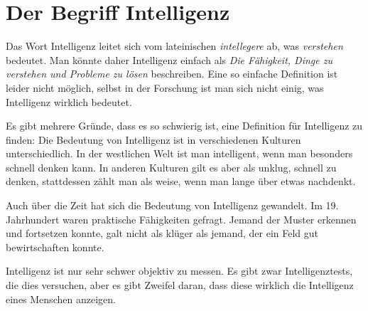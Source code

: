 \chapter{Der Begriff Intelligenz}

Das Wort Intelligenz leitet sich vom lateinischen \emph{intellegere} ab, was \emph{verstehen} bedeutet. Man könnte daher Intelligenz einfach als \emph{Die Fähigkeit, Dinge zu verstehen und Probleme zu lösen} beschreiben.
Eine so einfache Definition ist leider nicht möglich, selbst in der Forschung ist man sich nicht einig, was Intelligenz wirklich bedeutet.

Es gibt mehrere Gründe, dass es so schwierig ist, eine Definition für Intelligenz zu finden:
Die Bedeutung von Intelligenz ist in verschiedenen Kulturen unterschiedlich. In der westlichen Welt ist man intelligent, wenn man besonders schnell denken kann. In anderen Kulturen gilt es aber als unklug, schnell zu denken, stattdessen zählt man als weise, wenn man lange über etwas nachdenkt.

Auch über die Zeit hat sich die Bedeutung von Intelligenz gewandelt. Im 19. Jahrhundert waren praktische Fähigkeiten gefragt. Jemand der Muster erkennen und fortsetzen konnte, galt nicht als klüger als jemand, der ein Feld gut bewirtschaften konnte.

Intelligenz ist nur sehr schwer objektiv zu messen. Es gibt zwar Intelligenztests, die dies versuchen, aber es gibt Zweifel daran, dass diese wirklich die Intelligenz eines Menschen anzeigen.
